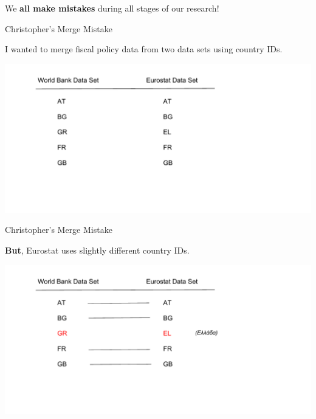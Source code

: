 \documentclass[10pt]{beamer}
\begin{document}
\begin{frame}

    \begin{center}
        {\LARGE{We \textbf{all make mistakes} during all stages of our research!}}

    \end{center}

\end{frame}


\begin{frame}{Christopher's Merge Mistake}

    I wanted to merge fiscal policy data from two data sets using country IDs.

    \begin{center}
        \includegraphics[scale=0.6]{img/wb_eurostat_match_pre.pdf}
    \end{center}

\end{frame}

\begin{frame}{Christopher's Merge Mistake}

    \textbf{But}, Eurostat uses slightly different country IDs.

    \begin{center}
        \includegraphics[scale=0.6]{img/wb_eurostat_match_post.pdf}
    \end{center}

\end{frame}
\end{document}
